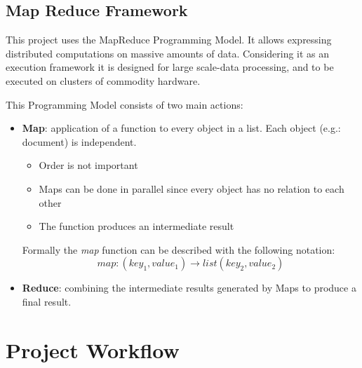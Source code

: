 \documentclass[a4paper,11pt, twoside, openright]{article}
\begin{document}
	\subsection{Map Reduce Framework}

		This project uses the MapReduce Programming Model. It allows expressing distributed computations on massive amounts of data. Considering it as an execution framework it is designed for large scale-data processing, and to be executed on clusters of commodity hardware.

		\bigskip

		\noindent
		This Programming Model consists of two main actions:
		\begin{itemize}
			\item \textbf{Map}: application of a function to every object in a list. Each object (e.g.: document) is independent.
			\begin{itemize}
				\item Order is not important
				\item Maps can be done in parallel since every object has no relation to each other
				\item The function produces an intermediate result
			\end{itemize}
			
			Formally the \textit{map} function can be described with the following notation: \[ map:(key_1, value_1) \to list(key_2, value_2) \]
			\item \textbf{Reduce}: combining the intermediate results generated by Maps to produce a final result.
		\end{itemize}

	\section{Project Workflow}
\end{document}
